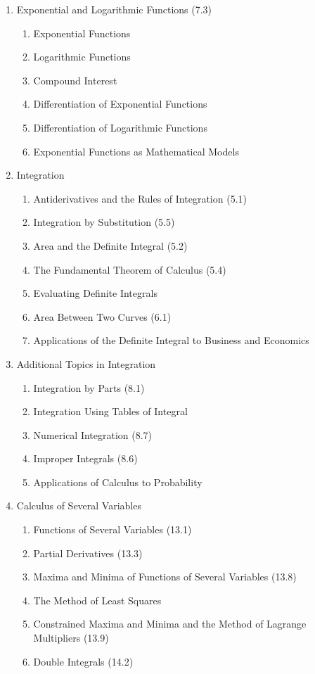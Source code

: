 \documentclass{article}
\begin{document}
\begin{enumerate}
\begin{enumerate}
	\end{enumerate}
\item Exponential and Logarithmic Functions (7.3)
	\begin{enumerate}
	\item Exponential Functions
	\item Logarithmic Functions
	\item Compound Interest
	\item Differentiation of Exponential Functions
	\item Differentiation of Logarithmic Functions
	\item Exponential Functions as Mathematical Models
	\end{enumerate}
\item Integration
 	\begin{enumerate}
	\item Antiderivatives and the Rules of Integration (5.1)
	\item Integration by Substitution (5.5)
	\item Area and the Definite Integral (5.2)
	\item The Fundamental Theorem of Calculus (5.4)
	\item Evaluating Definite Integrals
	\item Area Between Two Curves (6.1)
	\item Applications of the Definite Integral to Business and Economics
	\end{enumerate}
\item Additional Topics in Integration
	\begin{enumerate}
	\item Integration by Parts (8.1)
	\item Integration Using Tables of Integral
	\item Numerical Integration (8.7)
	\item Improper Integrals (8.6)
	\item Applications of Calculus to Probability
	\end{enumerate}
\item Calculus of Several Variables
	\begin{enumerate}
	\item Functions of Several Variables (13.1)
	\item Partial Derivatives (13.3)
	\item Maxima and Minima of Functions of Several Variables (13.8)
	\item The Method of Least Squares
	\item Constrained Maxima and Minima and the Method of Lagrange Multipliers (13.9)
	\item Double Integrals (14.2)
	\end{enumerate}
\end{enumerate}
\end{document}
